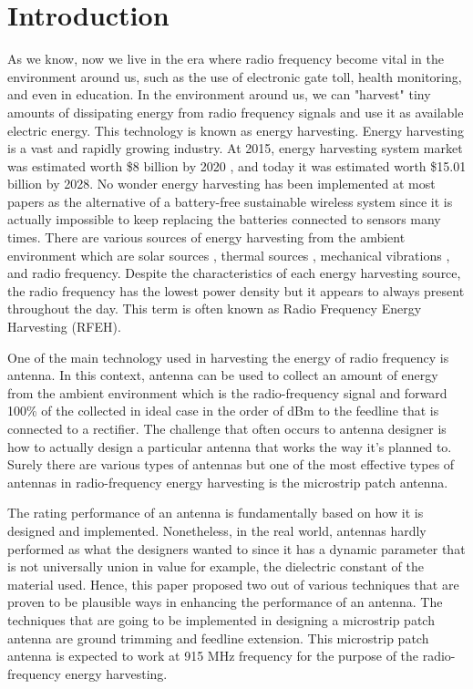 \documentclass[conference]{IEEEtran}
\begin{document}
\section{Introduction}
As we know, now we live in the era where radio frequency become vital in the environment around us, such as the use of electronic gate toll, health monitoring, and even in education. In the environment around us, we can "harvest" tiny amounts of dissipating energy from radio frequency signals and use it as available electric energy. This technology is known as energy harvesting. Energy harvesting is a vast and rapidly growing industry. At 2015, energy harvesting system market was estimated worth \$8 billion by 2020 \cite{popresearch}, and today it was estimated worth \$15.01 billion by 2028. No wonder energy harvesting has been implemented at most papers as the alternative of a battery-free sustainable wireless system since it is actually impossible to keep replacing the batteries connected to sensors many times. There are various sources of energy harvesting from the ambient environment which are solar sources \cite{baccouch2016patch}, thermal sources \cite{kishore2018review}, mechanical vibrations \cite{wei2017comprehensive}, and radio frequency. Despite the characteristics of each energy harvesting source, the radio frequency has the lowest power density but it appears to always present throughout the day. This term is often known as Radio Frequency Energy Harvesting (RFEH). 

One of the main technology used in harvesting the energy of radio frequency is antenna. In this context, antenna can be used to collect an amount of energy from the ambient environment which is the radio-frequency signal and forward 100\% of the collected in ideal case in the order of dBm to the feedline that is connected to a rectifier. The challenge that often occurs to antenna designer is how to actually design a particular antenna that works the way it's planned to. Surely there are various types of antennas but one of the most effective types of antennas in radio-frequency energy harvesting is the microstrip patch antenna. 

The rating performance of an antenna is fundamentally based on how it is designed and implemented. Nonetheless, in the real world, antennas hardly performed as what the designers wanted to since it has a dynamic parameter that is not universally union in value for example, the dielectric constant of the material used. Hence, this paper proposed two out of various techniques that are proven to be plausible ways in enhancing the performance of an antenna. The techniques that are going to be implemented in designing a microstrip patch antenna are ground trimming and feedline extension. This microstrip patch antenna is expected to work at 915 MHz frequency for the purpose of the radio-frequency energy harvesting. 
\end{document}
